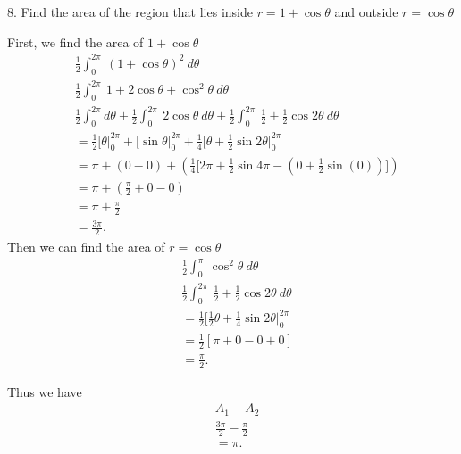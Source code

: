 \documentclass{report}
\begin{document}
    \pagebreak \bigbreak \noindent 
    \begin{mdframed}
        8. Find the area of the region that lies inside $r = 1+\cos{\theta}$ and outside $r=\cos{\theta}$
    \end{mdframed}
    \bigbreak \noindent 
    First, we find the area of $1+\cos{\theta}$
    \begin{align*}
        &\frac{1}{2}\int_{0}^{2\pi}\ (1+\cos{\theta })^{2}\ d\theta  \\
        &\frac{1}{2}\int_{0}^{2\pi}\ 1+2\cos{\theta } + \cos^{2}{\theta }\ d\theta  \\
        &\frac{1}{2}\int_{0}^{2\pi}d\theta  + \frac{1}{2}\int_{0}^{2\pi}\ 2\cos{\theta }\ d\theta  + \frac{1}{2}\int_{0}^{2\pi}\ \frac{1}{2} + \frac{1}{2}\cos{2\theta }\ d\theta  \\
        &=\frac{1}{2}\bigg[\theta \bigg|_0^{2\pi} + \bigg[\sin{\theta }\bigg|_0^{2\pi} + \frac{1}{4}\bigg[\theta +\frac{1}{2} \sin{2\theta }\bigg|_0^{2\pi} \\
        &= \pi + \left(0-0\right) + \left(\frac{1}{4}\bigg[2\pi + \frac{1}{2}\sin{4\pi} - \left(0 + \frac{1}{2}\sin{(0)}\right)\bigg]\right) \\
        &=\pi + \left(\frac{\pi}{2}+0 - 0\right) \\
        &=\pi+\frac{\pi}{2}\\
        &=\frac{3\pi}{2}
    .\end{align*}
    \bigbreak \noindent 
    Then we can find the area of $r = \cos{\theta}$
    \begin{align*}
        &\frac{1}{2}\int_{0}^{\pi}\ \cos^{2}{\theta } \ d\theta  \\
        &\frac{1}{2}\int_{0}^{2\pi}\ \frac{1}{2} + \frac{1}{2}\cos{2\theta }\ d\theta  \\
        &=\frac{1}{2}\bigg[\frac{1}{2}\theta +\frac{1}{4}\sin{2\theta}\bigg|_0^{2\pi} \\
        &=\frac{1}{2}\left[\pi + 0 - 0 + 0 \right] \\
        &=\frac{\pi}{2}
    .\end{align*}

    \bigbreak \noindent 
    Thus we have 
    \begin{align*}
        &A_{1} - A_{2} \\
        &\frac{3\pi}{2} - \frac{\pi}{2} \\
        &= \pi
    .\end{align*}
    

    



     
 
\end{document}
